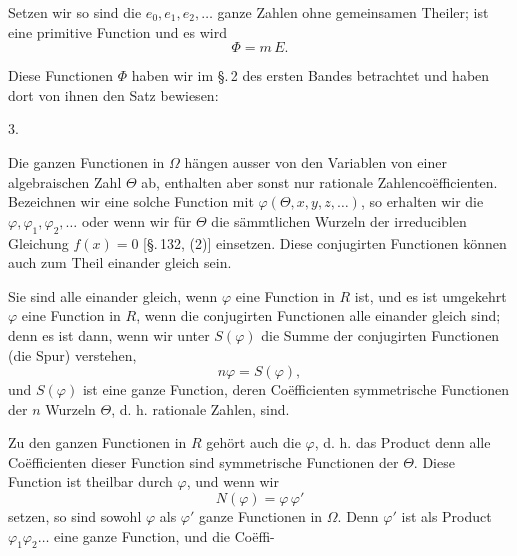 
Setzen wir
so sind die $e_0, e_1, e_2, \ldots$ ganze Zahlen ohne gemeinsamen Theiler;
ist eine primitive Function und es wird
\[ \Phi = m\,E. \]

Diese Functionen $\Phi$ haben wir im \S.\,2 des ersten Bandes betrachtet und haben dort von ihnen den Satz bewiesen:

3. 

Die ganzen Functionen in $\Omega$ h\"angen ausser von den Variablen von einer algebraischen Zahl $\Theta$ ab, enthalten aber sonst nur rationale Zahlenco\"efficienten. Bezeichnen wir eine solche Function mit $\varphi(\Theta, x, y, z, \ldots)$, so erhalten wir die  $\varphi, \varphi_1, \varphi_2, \ldots$ oder
wenn wir f\"ur $\Theta$ die s\"ammtlichen Wurzeln der irreduciblen Gleichung $f(x)=0$ [\S.\,132, (2)] einsetzen. Diese conjugirten Functionen k\"onnen auch zum Theil einander gleich sein.

Sie sind alle einander gleich, wenn $\varphi$ eine Function in $R$ ist, und es ist umgekehrt $\varphi$ eine Function in $R$, wenn die conjugirten Functionen alle einander gleich sind; denn es ist dann, wenn wir unter $S(\varphi)$ die Summe der conjugirten Functionen (die Spur) verstehen,
\[ n\varphi = S(\varphi), \]
und $S(\varphi)$ ist eine ganze Function, deren Co\"efficienten symmetrische Functionen der $n$ Wurzeln $\Theta$, d. h. rationale Zahlen, sind.

Zu den ganzen Functionen in $R$ geh\"ort auch die  $\varphi$, d. h. das Product
denn alle Co\"efficienten dieser Function sind symmetrische Functionen der $\Theta$. Diese Function ist theilbar durch $\varphi$, und wenn wir
\[ N(\varphi) = \varphi\,\varphi' \]
setzen, so sind sowohl $\varphi$ als $\varphi'$ ganze Functionen in $\Omega$. Denn $\varphi'$ ist als Product $\varphi_1\varphi_2\ldots$ eine ganze Function, und die Co\"effi-
